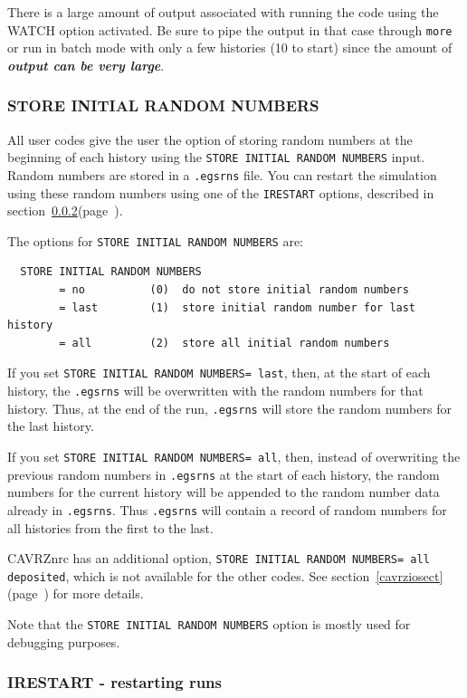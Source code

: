 \documentclass[12pt,twoside]{article}  %
\newcommand{\lpage}[1]{(page~\pageref{#1})}
\begin{document}
There is a large amount of output associated with running the code
using the WATCH option activated. Be sure to pipe the output
in that case through \verb+more+ or run in batch mode with only a few
histories (10 to start) since the amount of {\bfseries {\em output can be
very large}}.

\subsubsection{STORE INITIAL RANDOM NUMBERS}
\label{rnssect}
All user codes give the user the option of storing random
numbers at the beginning of each history using 
the {\tt STORE INITIAL RANDOM NUMBERS} input.  Random numbers are stored
in a {\tt .egsrns} file.  You can restart the simulation
using these random numbers using one of the {\tt IRESTART} options,
described in section~\ref{restartsect}\lpage{restartsect}.  

The options for {\tt STORE INITIAL RANDOM NUMBERS} are: 

\begin{verbatim}
  STORE INITIAL RANDOM NUMBERS
        = no          (0)  do not store initial random numbers
        = last        (1)  store initial random number for last history
        = all         (2)  store all initial random numbers
\end{verbatim}

If you set {\tt STORE INITIAL RANDOM NUMBERS= last}, then, at the start
of each history, the {\tt .egsrns} will be overwritten with the random
numbers for that history.  Thus, at the end of the run, {\tt .egsrns} 
will store the random numbers for the last history.

If you set {\tt STORE INITIAL RANDOM NUMBERS= all}, then, instead of 
overwriting the previous random numbers in {\tt .egsrns} at the start of
each history, the random numbers for the current history will be appended
to the random number data already in {\tt .egsrns}.  Thus {\tt .egsrns} will
contain a record of random numbers for all histories from the first to 
the last.

CAVRZnrc has an additional option, 
{\tt STORE INITIAL RANDOM NUMBERS= all deposited},
which is not available for the other codes.  See
section~\ref{cavrziosect}\lpage{cavrziosect} for more details.

Note that the {\tt STORE INITIAL RANDOM NUMBERS} option is mostly used for
debugging purposes. 

\subsubsection{IRESTART - restarting runs}
\label{restartsect}
\end{document}
